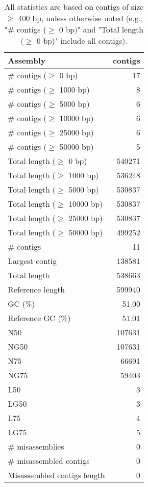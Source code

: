 \documentclass[12pt,a4paper]{article}
\begin{document}
\begin{table}[ht]
\begin{center}
\caption{All statistics are based on contigs of size $\geq$ 400 bp, unless otherwise noted (e.g., "\# contigs ($\geq$ 0 bp)" and "Total length ($\geq$ 0 bp)" include all contigs).}
\begin{tabular}{|l*{1}{|r}|}
\hline
Assembly & contigs \\ \hline
\# contigs ($\geq$ 0 bp) & 17 \\ \hline
\# contigs ($\geq$ 1000 bp) & 8 \\ \hline
\# contigs ($\geq$ 5000 bp) & 6 \\ \hline
\# contigs ($\geq$ 10000 bp) & 6 \\ \hline
\# contigs ($\geq$ 25000 bp) & 6 \\ \hline
\# contigs ($\geq$ 50000 bp) & 5 \\ \hline
Total length ($\geq$ 0 bp) & 540271 \\ \hline
Total length ($\geq$ 1000 bp) & 536248 \\ \hline
Total length ($\geq$ 5000 bp) & 530837 \\ \hline
Total length ($\geq$ 10000 bp) & 530837 \\ \hline
Total length ($\geq$ 25000 bp) & 530837 \\ \hline
Total length ($\geq$ 50000 bp) & 499252 \\ \hline
\# contigs & 11 \\ \hline
Largest contig & 138581 \\ \hline
Total length & 538663 \\ \hline
Reference length & 599940 \\ \hline
GC (\%) & 51.00 \\ \hline
Reference GC (\%) & 51.01 \\ \hline
N50 & 107631 \\ \hline
NG50 & 107631 \\ \hline
N75 & 66691 \\ \hline
NG75 & 59403 \\ \hline
L50 & 3 \\ \hline
LG50 & 3 \\ \hline
L75 & 4 \\ \hline
LG75 & 5 \\ \hline
\# misassemblies & 0 \\ \hline
\# misassembled contigs & 0 \\ \hline
Misassembled contigs length & 0 \\ \hline

\end{tabular}
\end{center}
\end{table}
\end{document}
